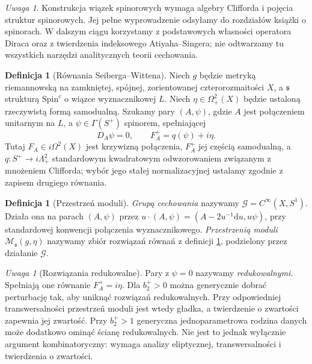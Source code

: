 \documentclass[11pt,a4paper]{report}
\numberwithin{equation}{section}
\theoremstyle{plain}
\theoremstyle{definition}
\newtheorem{definicja}[twierdzenie]{Definicja}
\theoremstyle{remark}
\newtheorem{uwaga}[twierdzenie]{Uwaga}
\begin{document}
\begin{uwaga}
Konstrukcja wiązek spinorowych wymaga algebry Clifforda
i pojęcia struktur spinorowych. Jej pełne wyprowadzenie
odsyłamy do rozdziałów książki o spinorach.
W dalszym ciągu korzystamy z podstawowych własności
operatora Diraca oraz z twierdzenia indeksowego
Atiyaha--Singera; nie odtwarzamy tu wszystkich narzędzi
analitycznych teorii cechowania.
\end{uwaga}

\begin{definicja}[Równania Seiberga--Wittena]
\label{def:tg-sw-eqn}
Niech $g$ będzie metryką riemannowską na zamkniętej,
spójnej, zorientowanej czterorozmaitości $X$, a
$\mathfrak s$ strukturą $\mathrm{Spin}^c$ o wiązce
wyznacznikowej $L$. Niech $\eta\in\Omega^2_+(X)$
będzie ustaloną rzeczywistą formą samodualną.
Szukamy pary $(A,\psi)$, gdzie $A$ jest połączeniem
unitarnym na $L$, a $\psi\in\Gamma(S^+)$ spinorem,
spełniającej
\[
D_A\psi=0,\qquad F_A^+=q(\psi)+i\eta.
\]
Tutaj $F_A\in i\Omega^2(X)$ jest krzywizną połączenia,
$F_A^+$ jej częścią samodualną, a
$q:S^+\to i\Lambda^2_+$ standardowym kwadratowym
odwzorowaniem związanym z mnożeniem Clifforda;
wybór jego stałej normalizacyjnej ustalamy zgodnie
z zapisem drugiego równania.
\end{definicja}

\begin{definicja}[Przestrzeń moduli]
\emph{Grupą cechowania} nazywamy
$\mathcal G=C^\infty(X,S^1)$.
Działa ona na parach $(A,\psi)$ przez
$u\cdot(A,\psi)=(A-2u^{-1}\mathrm du,u\psi)$,
przy standardowej konwencji połączenia wyznacznikowego.
\emph{Przestrzenią moduli} $\mathcal M_{\mathfrak s}(g,\eta)$
nazywamy zbiór rozwiązań równań z definicji
\ref{def:tg-sw-eqn}, podzielony przez działanie $\mathcal G$.
\end{definicja}

\begin{uwaga}[Rozwiązania redukowalne]
Pary z $\psi=0$ nazywamy \emph{redukowalnymi}.
Spełniają one równanie $F_A^+=i\eta$.
Dla $b_2^+>0$ można generycznie dobrać perturbację
tak, aby uniknąć rozwiązań redukowalnych. Przy odpowiedniej
transwersalności przestrzeń moduli jest wtedy gładka,
a twierdzenie o zwartości zapewnia jej zwartość.
Przy $b_2^+>1$ generyczna jednoparametrowa rodzina danych
może dodatkowo ominąć ścianę redukowalnych. Nie jest to jednak wyłącznie argument
kombinatoryczny: wymaga analizy eliptycznej, transwersalności
i twierdzenia o zwartości.
\end{uwaga}
\end{document}
